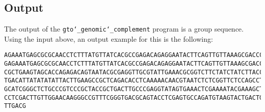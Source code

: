 \subsection*{Output}
The output of the \texttt{gto\char`_genomic\char`_complement} program is a group sequence.\\
Using the input above, an output example for this is the following:
\begin{lstlisting}
AGAAATGAGCGCGCAACCTCTTTATGTTATCACGCCGAGACAGAGGAATACTTCAGTTGTTAAAGCGACCCTGAACGCC
GAGAAATGAGCGCGCAACCTCTTTATGTTATCACGCCGAGACAGAGGAATACTTCAGTTGTTAAAGCGACCCTGAACGC
CGCTGAAGTAGCACCAGAGACAGTAATACGCGAGGTTGCGTATTGAAACGCGGTCTTCTATCTATCTTACCACATTCTT
TGACATTATATATATTACTTGAAGCCGCTCAGACACCTCAAAAACAACGTAATCTCTCGGTTCTCCAGCCTGCAGGAGT
GCATCGGGCTCTGCCCGTCCCGCTACCGCTGACTTGCCCGAGGTATAGTGAAACTCGAAAATACGAAAGCTGAGGAGGT
CCTCGACTTGTTGGAACAAGGGCCGTTTCGGGTGACGCAGTACCTCGAGTGCCAGATGTAAGTACTGACTGATTGGCAT
TTGACG
\end{lstlisting}